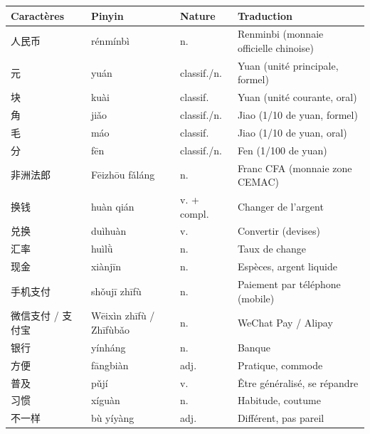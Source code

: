 \documentclass[11pt]{article}
\begin{document}
\begin{center}
\begin{tabularx}{\linewidth}{|X|X|X|X|}
\hline
\rowcolor{popblueL} Caractères & Pinyin & Nature & Traduction \\
\hline
人民币 & rénmínbì & n. & Renminbi (monnaie officielle chinoise) \\
\hline
元 & yuán & classif./n. & Yuan (unité principale, formel) \\
\hline
块 & kuài & classif. & Yuan (unité courante, oral) \\
\hline
角 & jiǎo & classif./n. & Jiao (1/10 de yuan, formel) \\
\hline
毛 & máo & classif. & Jiao (1/10 de yuan, oral) \\
\hline
分 & fēn & classif./n. & Fen (1/100 de yuan) \\
\hline
非洲法郎 & Fēizhōu fǎláng & n. & Franc CFA (monnaie zone CEMAC) \\
\hline
换钱 & huàn qián & v. + compl. & Changer de l'argent \\
\hline
兑换 & duìhuàn & v. & Convertir (devises) \\
\hline
汇率 & huìlǜ & n. & Taux de change \\
\hline
现金 & xiànjīn & n. & Espèces, argent liquide \\
\hline
手机支付 & shǒujī zhīfù & n. & Paiement par téléphone (mobile) \\
\hline
微信支付 / 支付宝 & Wēixìn zhīfù / Zhīfùbǎo & n. & WeChat Pay / Alipay \\
\hline
银行 & yínháng & n. & Banque \\
\hline
方便 & fāngbiàn & adj. & Pratique, commode \\
\hline
普及 & pǔjí & v. & Être généralisé, se répandre \\
\hline
习惯 & xíguàn & n. & Habitude, coutume \\
\hline
不一样 & bù yíyàng & adj. & Différent, pas pareil \\
\hline
\end{tabularx}
\end{center}
\end{document}
